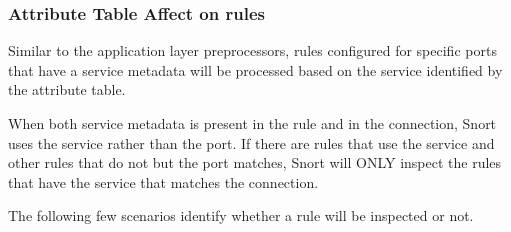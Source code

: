 \documentclass[english]{report}
\begin{document}
\subsubsection{Attribute Table Affect on rules}

Similar to the application layer preprocessors, rules configured for specific
ports that have a service metadata will be processed based on the service
identified by the attribute table.

When both service metadata is present in the rule and in the connection, Snort uses
the service rather than the port.  If there are rules that use the service
and other rules that do not but the port matches, Snort will ONLY inspect the rules
that have the service that matches the connection.

The following few scenarios identify whether a rule will be inspected or not.
\end{document}
